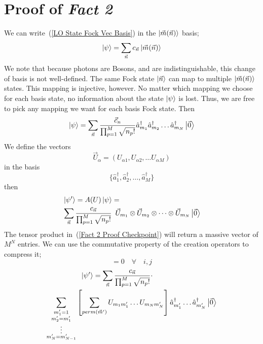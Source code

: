 \documentclass[aps,pra,twocolumn,showpacs,superscriptaddress,floatfix,10pt]{revtex4}
\begin{document}
\section{Proof of \textit{Fact 2}}
\label{Proof of Fact 2}
We can write~(\ref{LO State Fock Vec Basis}) in the $\ket{\vec{m}(\vec{n})}$ basis;
\begin{equation}
\ket{\psi} = \sum_{\vec{n}} c_{\vec{n}} \ket{\vec{m}(\vec{n})}
\end{equation}
We note that because photons are Bosons, and are indistinguishable, this change of basis is not well-defined. The same Fock state $\ket{\vec{n}}$ can map to multiple $\ket{\vec{m}(\vec{n})}$ states. This mapping is injective, however. No matter which mapping we choose for each basis state, no information about the state $\ket{\psi}$ is lost. Thus, we are free to pick any mapping we want for each basis Fock state. Then
\begin{equation}
\ket{\psi} = \sum_{\vec{n}} \frac{\vec{c}_n}{\prod_{p=1}^{M} \sqrt{n_p !}} \hat{a}_{m_1}^\dagger \hat{a}_{m_2}^\dagger \dots \hat{a}_{m_N}^\dagger \ket{\vec{0}}
\end{equation}
We define the vectors
\begin{equation}
\vec{U}_\alpha = (U_{\alpha 1},U_{\alpha 2},\dots U_{\alpha M})
\end{equation}
in the basis
\begin{equation}
\{ \hat{a}_{1}^\dagger,\hat{a}_{2}^\dagger, \dots, \hat{a}_{M}^\dagger \}
\end{equation}
then
\begin{eqnarray}
\label{Fact 2 Proof Checkpoint}
& \ket{\psi^\prime} = A(U) \ket{\psi} =  \quad \quad \quad \quad \quad \quad \quad \quad \quad \quad \\ & \nonumber
\sum_{\vec{n}} \frac{c_{\vec{n}}}{\prod_{p=1}^{M} \sqrt{n_p !}} \enspace \vec{U}_{m_1} \otimes \vec{U}_{m_2} \otimes \dots \otimes \vec{U}_{m_N} \ket{\vec{0}}
\end{eqnarray}
The tensor product in~(\ref{Fact 2 Proof Checkpoint}) will return a massive vector of $M^N$ entries. We can use the commutative property of the creation operators to compress it;
\begin{equation}
[\hat{a}_i ^ \dagger,\hat{a}_j ^ \dagger] = 0 \quad \forall \quad i,j
\end{equation}
\begin{eqnarray}
 \ket{\psi^\prime} = \sum_{\vec{n}} \frac{c_{\vec{n}}}{\prod_{p=1}^{M} \sqrt{n_p !}} \cdot \quad \quad \quad \quad \quad \quad \quad \quad \quad \\  \nonumber \sum_{\substack{m_1^\prime = 1\\
		m_2^\prime = m_1^\prime\\
		\vdots \\
		m_N^\prime = m_{N-1}^\prime}}
\left[ \sum_{perm(\vec{m}^\prime)} U_{m_1 m_1^\prime} \dots U_{m_N m_N^\prime} \right] \hat{a}_{m_1^\prime}^\dagger \dots \hat{a}_{m_N^\prime}^\dagger \ket{\vec{0}}
\end{eqnarray}
\end{document}
